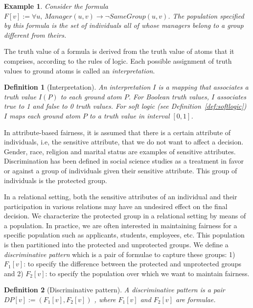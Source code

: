 \documentclass[11pt]{article}
\newtheorem{mydef}{\textbf{Definition}}
\newtheorem{myex}{\textbf{Example}}
\begin{document}
\begin{myex}
\label{ex:disformula}
Consider the formula $F[v] := \forall u, \, \textit{Manager}(u,v) \rightarrow \neg \textit{SameGroup}(u, v)$. The population specified by this formula is the set of individuals all of whose managers belong to a group different from theirs. 
\end{myex}

The truth value of a formula is derived from the truth value of atoms that it comprises, according to the rules of logic. Each possible assignment of truth values to ground atoms is called an \emph{interpretation}. 


\begin{mydef}[Interpretation]
An interpretation $I$ is a mapping that associates a truth value $I(P)$ to each ground atom $P$. For Boolean truth values, $I$ associates true to 1 and false to 0 truth values. For soft logic (see Definition~\ref{def:softlogic}) $I$ maps each ground atom $P$ to a truth value in interval $[0, 1]$.
\end{mydef}

In attribute-based fairness, it is assumed that there is a certain attribute of individuals, i.e, the sensitive attribute,  that we do not want to affect a decision. Gender, race, religion and marital status are examples of sensitive attributes. Discrimination has been defined in social science studies as a treatment in favor or against a group of individuals given their sensitive attribute. This group of individuals is the protected group. 

In a relational setting, both the sensitive attributes of an individual and their participation in various relations may have an undesired effect on the final decision. We characterize the protected group in a relational setting by means of a population. In practice, we are often interested in maintaining fairness for a specific population such as applicants, students, employees, etc. This population is then partitioned into the protected and unprotected groups. We define a \emph{discriminative pattern} which is a pair of formulae to capture these groups: 1) $F_1[v]$: to specify the difference between the protected and unprotected groups and 2) $F_2[v]$: to specify the population over which we want to maintain fairness. 

\begin{mydef}[Discriminative pattern]
A discriminative pattern is a pair $\textit{DP}[v]:=(F_1[v], F_2[v])$ , where $F_1[v]$ and $F_2[v]$ are formulae.
\end{mydef}
\end{document}
